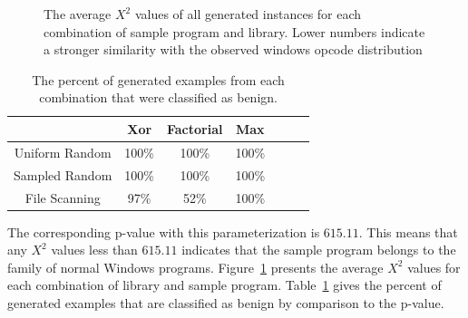     \begin{figure}[t!]
        \vspace{-50pt}
        \caption[Results for blending in with benign programs]
        {The average $X^2$ values of all generated instances for each
        combination of sample program and library. Lower numbers indicate a
        stronger similarity with the observed windows opcode distribution}
        \label{tab:results-windows-like-avg}
    \end{figure}

    \begin{table}
        \centering
        \begin{tabular}{|c||c|c|c|c|c|c|}
            \hline
                            & Xor & Factorial & Max \\
            \hline
            Uniform Random  & 100\% & 100\% & 100\%\\
            \hline
            Sampled Random  & 100\% & 100\% & 100\%\\
            \hline
            File Scanning   & 97\% & 52\% & 100\% \\
            \hline
        \end{tabular}
        \caption{The percent of generated examples from each combination
            that were classified as benign.}
        \label{tab:results-windows-like-passed}
    \end{table}

    The corresponding p-value with this parameterization is $615.11$. This
    means that any $X^2$ values less than $615.11$ indicates that the sample
    program belongs to the family of normal Windows programs.
    Figure~\ref{tab:results-windows-like-avg} presents the average $X^2$
    values for each combination of library and sample program.
    Table~\ref{tab:results-windows-like-passed} gives the percent of
    generated examples that are classified as benign by comparison to the
    p-value.

